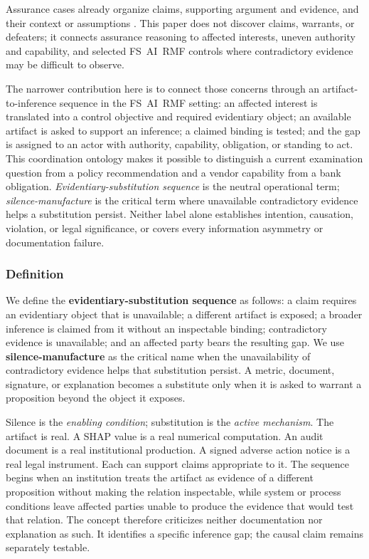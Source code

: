 Assurance cases already organize claims, supporting argument and evidence, and
their context or assumptions \parencite{bloomfield2010}. This paper does not
discover claims, warrants, or defeaters; it connects assurance reasoning to
affected interests, uneven authority and capability, and selected FS~AI~RMF
controls where contradictory evidence may be difficult to observe.

The narrower contribution here is to connect those concerns through an
artifact-to-inference sequence in the FS~AI~RMF setting: an affected interest
is translated into a control objective and required evidentiary object; an
available artifact is asked to support an inference; a claimed binding is
tested; and the gap is assigned to an actor with authority, capability,
obligation, or standing to act. This coordination ontology makes it possible to
distinguish a current examination question from a policy recommendation and a
vendor capability from a bank obligation. \emph{Evidentiary-substitution
sequence} is the neutral operational term; \emph{silence-manufacture} is the
critical term where unavailable contradictory evidence helps a substitution
persist. Neither label alone establishes intention, causation, violation, or
legal significance, or covers every information asymmetry or documentation
failure.

\subsubsection{Definition}
\label{sec:diagnostics:silence-manufacture:definition}

We define the \textbf{evidentiary-substitution sequence} as follows: a claim requires an evidentiary object that is unavailable; a different artifact is exposed; a broader inference is claimed from it without an inspectable binding; contradictory evidence is unavailable; and an affected party bears the resulting gap. We use \textbf{silence-manufacture} as the critical name when the unavailability of contradictory evidence helps that substitution persist. A metric, document, signature, or explanation becomes a substitute only when it is asked to warrant a proposition beyond the object it exposes.

Silence is the \emph{enabling condition}; substitution is the \emph{active mechanism}. The artifact is real. A SHAP value is a real numerical computation. An audit document is a real institutional production. A signed adverse action notice is a real legal instrument. Each can support claims appropriate to it. The sequence begins when an institution treats the artifact as evidence of a different proposition without making the relation inspectable, while system or process conditions leave affected parties unable to produce the evidence that would test that relation. The concept therefore criticizes neither documentation nor explanation as such. It identifies a specific inference gap; the causal claim remains separately testable.


